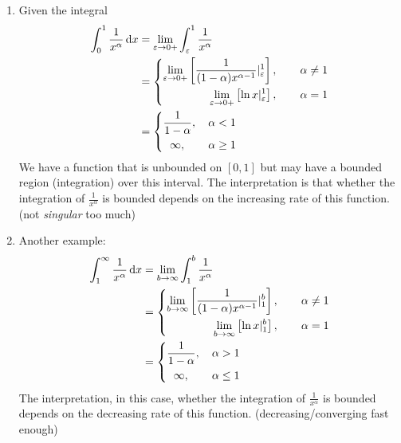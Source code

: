 \begin{example}
\begin{enumerate}
\item
Given the integral 
\begin{align*}
\int_0^1\frac{1}{x^{\alpha}}\,\mathrm{d} x&=\lim_{\varepsilon\to0+}\int_\varepsilon^1\frac{1}{x^{\alpha}}\\
&=
\left\{
\begin{aligned}
\lim_{\varepsilon\to0+}\left[\frac{1}{(1-\alpha)x^{\alpha-1}}|_{\varepsilon}^1\right],\qquad \alpha\ne1\\
\lim_{\varepsilon\to0+}\left[\ln x|_{\varepsilon}^1\right],\qquad \alpha=1\\
\end{aligned}
\right.\\
&=
\left\{
\begin{aligned}
\frac{1}{1-\alpha},\quad \alpha<1\\
\infty,\qquad \alpha\ge1\\
\end{aligned}
\right.\\
\end{align*}
We have a function that is unbounded on $[0,1]$ but may have a bounded region (integration) over this interval. The interpretation is that whether the integration of $\frac{1}{x^{\alpha}}$ is bounded depends on the increasing rate of this function. (not \emph{singular} too much)
\item
Another example:
\begin{align*}
\int_1^\infty\frac{1}{x^{\alpha}}\,\mathrm{d} x&=\lim_{b\to\infty}\int_1^b\frac{1}{x^{\alpha}}\\
&=
\left\{
\begin{aligned}
\lim_{b\to\infty}\left[\frac{1}{(1-\alpha)x^{\alpha-1}}|_{1}^b\right],\qquad \alpha\ne1\\
\lim_{b\to\infty}\left[\ln x|_{1}^b\right],\qquad \alpha=1\\
\end{aligned}
\right.\\
&=
\left\{
\begin{aligned}
\frac{1}{1-\alpha},\quad \alpha>1\\
\infty,\qquad \alpha\le1\\
\end{aligned}
\right.\\
\end{align*}
The interpretation, in this case, whether the integration of $\frac{1}{x^{\alpha}}$ is bounded depends on the decreasing rate of this function. (decreasing/converging fast enough)
\end{enumerate}
\end{example}
